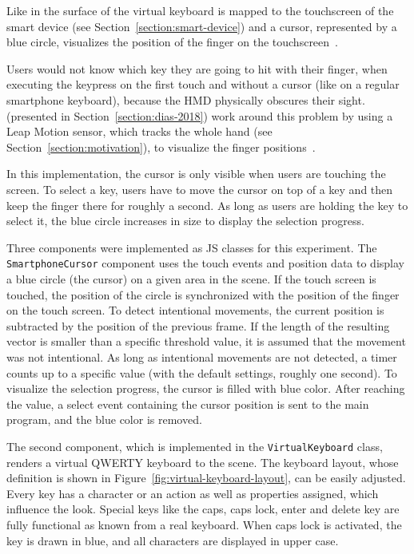 Like in  the surface of the virtual keyboard is mapped to the touchscreen of the smart device (see Section~\ref{section:smart-device}) and a cursor, represented by a blue circle, visualizes the position of the finger on the touchscreen~\cite[408]{Markussen.2013}.

Users would not know which key they are going to hit with their finger, when executing the keypress on the first touch and without a cursor (like on a regular smartphone keyboard), because the \gls{HMD} physically obscures their sight. \citeauthor{Dias.2018} (presented in Section~\ref{section:dias-2018}) work around this problem by using a Leap Motion sensor, which tracks the whole hand (see Section~\ref{section:motivation}), to visualize the finger positions~\cite[4]{Dias.2018}.

In this implementation, the cursor is only visible when users are touching the screen. To select a key, users have to move the cursor on top of a key and then keep the finger there for roughly a second. As long as users are holding the key to select it, the blue circle increases in size to display the selection progress.

Three components were implemented as \acrlong{JS} classes for this experiment. The \lstinline{SmartphoneCursor} component uses the touch events and position data to display a blue circle (the cursor) on a given area in the scene. If the touch screen is touched, the position of the circle is synchronized with the position of the finger on the touch screen.
To detect intentional movements, the current position is subtracted by the position of the previous frame. If the length of the resulting vector is smaller than a specific threshold value, it is assumed that the movement was not intentional.
As long as intentional movements are not detected, a timer counts up to a specific value (with the default settings, roughly one second). To visualize the selection progress, the cursor is filled with blue color. After reaching the value, a select event containing the cursor position is sent to the main program, and the blue color is removed. 

The second component, which is implemented in the \lstinline{VirtualKeyboard} class, renders a virtual QWERTY keyboard to the scene. The keyboard layout, whose definition is shown in Figure~\ref{fig:virtual-keyboard-layout}, can be easily adjusted. Every key has a character or an action as well as properties assigned, which influence the look. Special keys like the caps, caps lock, enter and delete key are fully functional as known from a real keyboard. When caps lock is activated, the key is drawn in blue, and all characters are displayed in upper case.

